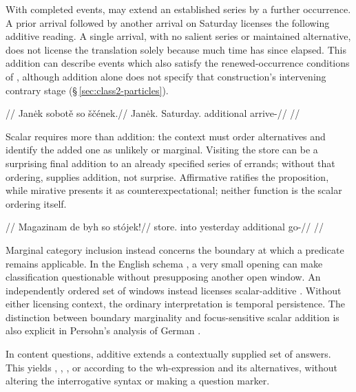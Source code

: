 With completed events,  may extend an established series by a further
occurrence. A prior arrival followed by another arrival on Saturday licenses
the following additive reading. A single arrival, with no salient series or
maintained alternative, does not license the translation solely because much
time has since elapsed. This addition can describe events which also satisfy
the renewed-occurrence conditions of , although addition alone
does not specify that construction's intervening contrary stage
(§\,\ref{sec:class2-particles}).

\pex
\begingl
\glpreamble {}//
\gla Janėk sobotě so ščének.//
\glb Janėk.\Dir{} Saturday.\Ind{} additional arrive-\Pf{}//
\glft {}//
\endgl
\xe

Scalar  requires more than addition: the context must order
alternatives and identify the added one as unlikely or marginal. Visiting the
store can be a surprising final addition to an already specified series of
errands; without that ordering,  supplies addition, not surprise.
Affirmative  ratifies the proposition, while mirative 
presents it as counterexpectational; neither function is the scalar ordering
itself.

\pex
\begingl
\glpreamble {}//
\gla Magazinam de byh so stójek!//
\glb store.\Ind{} into yesterday additional go-\Pf{}//
\glft {}//
\endgl
\xe

Marginal category inclusion instead concerns the boundary at which a predicate
remains applicable. In the English schema , a very small opening can make classification questionable
without presupposing another open window. An independently ordered set of
windows instead licenses scalar-additive . Without either licensing context, the ordinary interpretation is
temporal persistence.
The distinction between boundary marginality and focus-sensitive scalar
addition is also explicit in Persohn's analysis of German
\cite[§§4.1--4.2]{persohn2024scalar}.

In content questions, additive  extends a contextually supplied set of
answers. This yields , , ,
or  according to the wh-expression and its alternatives,
without altering the interrogative syntax or making  a question marker.

